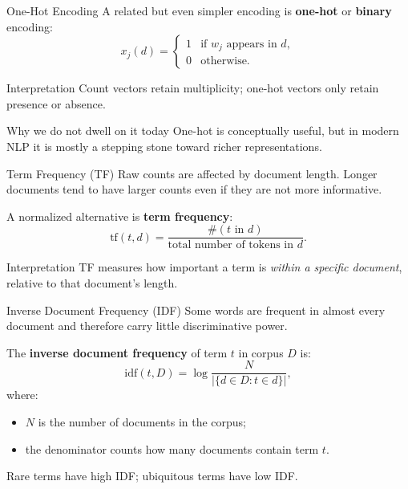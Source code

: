 \documentclass[aspectratio=169]{beamer}
\begin{document}
\begin{frame}{One-Hot Encoding}
A related but even simpler encoding is \textbf{one-hot} or \textbf{binary} encoding:
\[
 x_j(d)=
 \begin{cases}
 1 & \text{if } w_j \text{ appears in } d,\\
 0 & \text{otherwise.}
 \end{cases}
\]

\vspace{0.15cm}
\begin{block}{Interpretation}
Count vectors retain multiplicity; one-hot vectors only retain presence or absence.
\end{block}

\vspace{0.15cm}
\begin{alertblock}{Why we do not dwell on it today}
One-hot is conceptually useful, but in modern NLP it is mostly a stepping stone toward richer representations.
\end{alertblock}
\end{frame}
%
%
\begin{frame}{Term Frequency (TF)}
Raw counts are affected by document length. Longer documents tend to have larger counts even if they are not more informative.

\vspace{0.15cm}
A normalized alternative is \textbf{term frequency}:
\[
\mathrm{tf}(t,d) = \frac{\#(t \text{ in } d)}{\text{total number of tokens in } d}.
\]

\vspace{0.15cm}
\begin{block}{Interpretation}
TF measures how important a term is \emph{within a specific document}, relative to that document's length.
\end{block}
\end{frame}
%
%
\begin{frame}{Inverse Document Frequency (IDF)}
Some words are frequent in almost every document and therefore carry little discriminative power.

\vspace{0.15cm}
The \textbf{inverse document frequency} of term $t$ in corpus $D$ is:
\[
\mathrm{idf}(t,D) = \log\frac{N}{|\{d\in D : t\in d\}|},
\]
where:
\begin{itemize}
    \item $N$ is the number of documents in the corpus;
    \item the denominator counts how many documents contain term $t$.
\end{itemize}

\vspace{0.1cm}
Rare terms have high IDF; ubiquitous terms have low IDF.
\end{frame}
\end{document}
